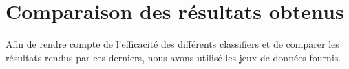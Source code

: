 \section{Comparaison des résultats obtenus}

Afin de rendre compte de l'efficacité des différents classifiers et de comparer les résultats rendus par ces derniers, nous avons utilisé les jeux de données fournis. 
